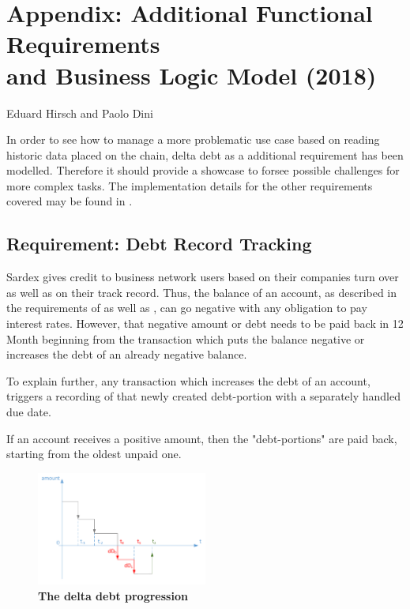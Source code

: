 \chapter*{Appendix: Additional Functional Requirements\\ and Business Logic Model (2018)}
\label{appendix}

\vspace{-1cm}
\begin{center}
Eduard Hirsch and Paolo Dini
\end{center}

In order to see how to manage a more problematic use case based on reading historic data placed on the chain, delta debt as a additional requirement has been modelled. Therefore it should provide a showcase to forsee possible challenges for more complex tasks. The implementation details for the other requirements covered may be found in \cite{INTERLACE_D32}.

\section{Requirement: Debt Record Tracking}

Sardex gives credit to business network users based on their companies turn over as well as on their track record. Thus, the balance of an account, as described in the requirements of \cite{INTERLACE_D21} as well as \cite{INTERLACE_D31}, can go negative with any obligation to pay interest rates. However, that negative amount or debt needs to be paid back in 12 Month beginning from the transaction which puts the balance negative or increases the debt of an already negative balance.

To explain further, any transaction which increases the debt of an account, triggers a recording of that newly created debt-portion with a separately handled due date.

If an account receives a positive amount, then the "debt-portions" are paid back, starting from the oldest unpaid one.

\begin{figure}[htbp]
  \centering
  \includegraphics[width=0.5\textwidth, clip, trim=1mm 1mm 1mm 1mm]{Figures/deltadebt}
  \caption{\bf\small The delta debt progression}
  \label{fig:debt-graph}
\end{figure}

